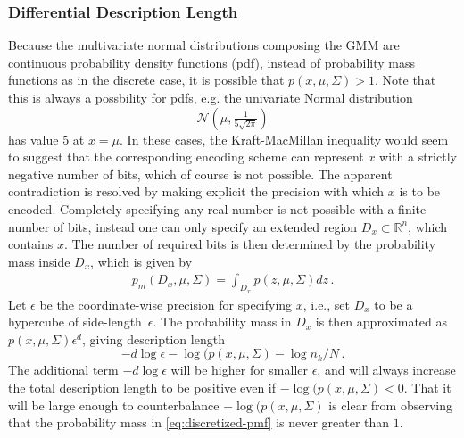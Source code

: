 \documentclass[a4paper,fleqn]{cas-sc}
\theoremstyle{remark}
\begin{document}
\subsubsection{Differential Description Length}
Because the multivariate normal distributions composing the GMM are continuous probability density functions (pdf), instead of probability mass functions as in the discrete case, it is possible that $p(x, \mu, \Sigma) > 1$. 
Note that this is always a possbility for pdfs, e.g. the univariate Normal distribution 
\[
\mathcal{N}(\mu,\tfrac{1}{5\sqrt{2\pi}})
\]
has value $5$ at $x=\mu$.
In these cases, the Kraft-MacMillan inequality would seem to suggest that the corresponding encoding scheme can represent $x$ with a strictly negative number of bits, which of course is not possible. The apparent contradiction is resolved by making explicit the precision with which $x$ is to be encoded. Completely specifying any real number is not possible with a finite number of bits, instead one can only specify an extended region $D_x \subset \mathbb{R}^n$, which contains $x$. The number of required bits is then determined by the probability mass inside $D_x$, which is given by 
\begin{gather} \label{eq:discretized-pmf}
    p_m(D_x, \mu, \Sigma) = \int_{D_x} p(z, \mu, \Sigma) dz\,.
\end{gather}
Let $\epsilon$ be the coordinate-wise precision for specifying $x$, i.e., set $D_x$ to be a hypercube of side-length~$\epsilon$. The probability mass in $D_x$ is then approximated as $p(x, \mu, \Sigma) \epsilon^{d}$, giving description length
\begin{equation} \label{eq:pmf-dl}
-d \log \epsilon -\log(p(x, \mu, \Sigma) - \log n_k/N \,.
\end{equation}
The additional term $-d\log{\epsilon}$ will be higher for smaller $\epsilon$, and will always increase the total description length to be positive even if $-\log(p(x, \mu, \Sigma) < 0$. That it will be large enough to counterbalance $-\log(p(x, \mu, \Sigma)$ is clear from observing that the probability mass in \eqref{eq:discretized-pmf} is never greater than $1$. 
\end{document}
